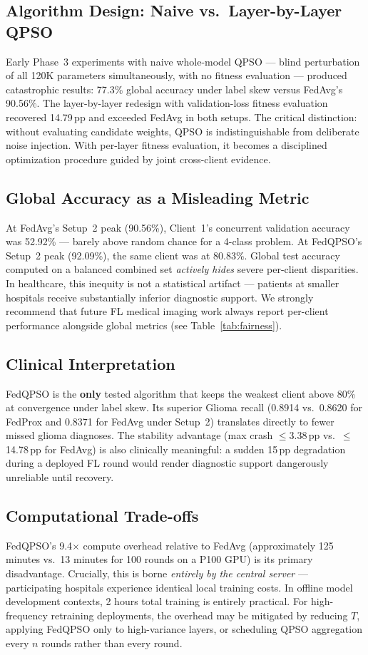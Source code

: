 \documentclass[conference]{IEEEtran}
\begin{document}
\subsection{Algorithm Design: Naive vs.\ Layer-by-Layer QPSO}
Early Phase~3 experiments with naive whole-model QPSO --- blind perturbation
of all 120K parameters simultaneously, with no fitness evaluation ---
produced catastrophic results: 77.3\% global accuracy under label skew
versus FedAvg's 90.56\%. The layer-by-layer redesign with validation-loss
fitness evaluation recovered 14.79\,pp and exceeded FedAvg in both setups.
The critical distinction: without evaluating candidate weights, QPSO is
indistinguishable from deliberate noise injection. With per-layer fitness
evaluation, it becomes a disciplined optimization procedure guided by joint
cross-client evidence.

\subsection{Global Accuracy as a Misleading Metric}
At FedAvg's Setup~2 peak (90.56\%), Client~1's concurrent validation
accuracy was 52.92\% --- barely above random chance for a 4-class problem.
At FedQPSO's Setup~2 peak (92.09\%), the same client was at 80.83\%.
Global test accuracy computed on a balanced combined set \emph{actively hides}
severe per-client disparities. In healthcare, this inequity is not a
statistical artifact --- patients at smaller hospitals receive substantially
inferior diagnostic support. We strongly recommend that future FL medical
imaging work always report per-client performance alongside global metrics
(see Table~\ref{tab:fairness}).

\subsection{Clinical Interpretation}
FedQPSO is the \textbf{only} tested algorithm that keeps the weakest client
above 80\% at convergence under label skew. Its superior Glioma recall (0.8914
vs.\ 0.8620 for FedProx and 0.8371 for FedAvg under Setup~2) translates
directly to fewer missed glioma diagnoses. The stability advantage
(max crash $\leq$3.38\,pp vs.\ $\leq$14.78\,pp for FedAvg) is also
clinically meaningful: a sudden 15\,pp degradation during a deployed FL
round would render diagnostic support dangerously unreliable until recovery.

\subsection{Computational Trade-offs}
FedQPSO's 9.4$\times$ compute overhead relative to FedAvg (approximately
125 minutes vs.\ 13 minutes for 100 rounds on a P100 GPU) is its primary
disadvantage. Crucially, this is borne \emph{entirely by the central server}
--- participating hospitals experience identical local training costs.
In offline model development contexts, 2 hours total training is
entirely practical. For high-frequency retraining deployments, the overhead
may be mitigated by reducing $T$, applying FedQPSO only to high-variance
layers, or scheduling QPSO aggregation every $n$ rounds rather than every
round.
\end{document}
